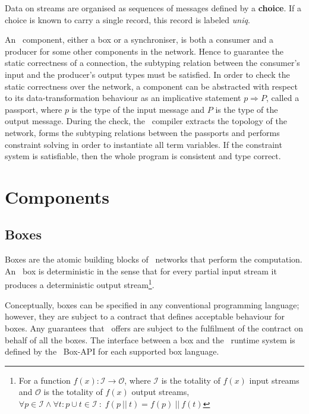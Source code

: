 Data on streams are organised as sequences of messages defined by a \textbf{choice}. If a choice is known to carry a single record, this record is labeled \emph{uniq}.

An \ak\ component, either a box or a synchroniser, is both a consumer and a producer for some other components in the network. Hence to guarantee the static correctness of a connection, the subtyping relation between the consumer's input and the producer's output types must be satisfied. In order to check the static correctness over the network, a component can be abstracted with respect to its data-transformation behaviour as an implicative statement $p \Rightarrow P$, called a passport, where $p$ is the type of the input message and $P$ is the type of the output message. During the check, the \ak\ compiler extracts the topology of the network, forms the subtyping relations between the passports and performs constraint solving in order to instantiate all term variables. If the constraint system is satisfiable, then the whole program is consistent and type correct.


\section{Components}
    \subsection*{Boxes}
Boxes are the atomic building blocks of \ak\ networks that perform the computation. An \ak\ box is deterministic in the sense that for every partial input stream it produces a deterministic output stream\footnote{For a function $f(x): \mathcal{I} \to \mathcal{O}$, where $\mathcal{I}$ is the totality of $f(x)$ input streams and $\mathcal{O}$ is the totality of $f(x)$ output streams, $\forall p \in \mathcal{I} \land \forall t:p \cup t \in \mathcal{I} \: : \; f(p \:||\: t) = f(p) \:||\: f(t)$}.

Conceptually, boxes can be specified in any conventional programming language; however, they are subject to a contract that defines acceptable behaviour for boxes. Any guarantees that \ak\ offers are subject to the fulfilment of the contract on behalf of all the boxes. The interface between a box and the \ak\ runtime system is defined by the \ak\ Box-API for each supported box language.

